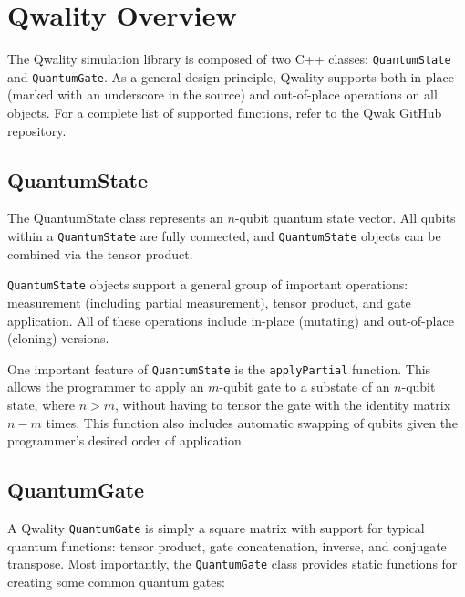 \documentclass{article}
\begin{document}
\appendixpage
\appendix

\section{Qwality Overview}
\label{sec:qwality-overview}

The Qwality simulation library is composed of two C++ classes: \lstinline$QuantumState$ and \lstinline$QuantumGate$. As a general design principle, Qwality supports both in-place (marked with an underscore in the source) and out-of-place operations on all objects. For a complete list of supported functions, refer to the Qwak GitHub repository.

\subsection{QuantumState}

The QuantumState class represents an $n$-qubit quantum state vector. All qubits within a \lstinline$QuantumState$ are fully connected, and \lstinline$QuantumState$ objects can be combined via the tensor product.

\lstinline$QuantumState$ objects support a general group of important operations: measurement (including partial measurement), tensor product, and gate application. All of these operations include in-place (mutating) and out-of-place (cloning) versions.

One important feature of \lstinline$QuantumState$ is the \lstinline$applyPartial$ function. This allows the programmer to apply an $m$-qubit gate to a substate of an $n$-qubit state, where $n>m$, without having to tensor the gate with the identity matrix $n-m$ times. This function also includes automatic swapping of qubits given the programmer’s desired order of application.

\subsection{QuantumGate}

A Qwality \lstinline$QuantumGate$ is simply a square matrix with support for typical quantum functions: tensor product, gate concatenation, inverse, and conjugate transpose. Most importantly, the \lstinline$QuantumGate$ class provides static functions for creating some common quantum gates:
\end{document}
